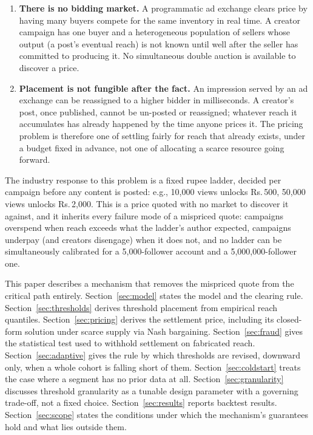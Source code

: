 \documentclass[11pt]{article}
\begin{document}
\begin{enumerate}[leftmargin=1.6em]
\item \textbf{There is no bidding market.} A programmatic ad exchange clears price by having many
buyers compete for the same inventory in real time. A creator campaign has one buyer and a
heterogeneous population of sellers whose output (a post's eventual reach) is not known until well
after the seller has committed to producing it. No simultaneous double auction is available to
discover a price.
\item \textbf{Placement is not fungible after the fact.} An impression served by an ad exchange can
be reassigned to a higher bidder in milliseconds. A creator's post, once published, cannot be
un-posted or reassigned; whatever reach it accumulates has already happened by the time anyone
prices it. The pricing problem is therefore one of settling fairly for reach that already exists,
under a budget fixed in advance, not one of allocating a scarce resource going forward.
\end{enumerate}

The industry response to this problem is a fixed rupee ladder, decided per campaign before any
content is posted: e.g., 10,000 views unlocks Rs.\,500, 50{,}000 views
unlocks Rs.\,2{,}000. This is a price quoted with no market to discover it against, and it inherits
every failure mode of a mispriced quote: campaigns overspend when reach exceeds what the ladder's
author expected, campaigns underpay (and creators disengage) when it does not, and no ladder can be
simultaneously calibrated for a 5,000-follower account and a 5,000,000-follower one.

This paper describes a mechanism that removes the mispriced quote from the critical path entirely.
Section~\ref{sec:model} states the model and the clearing rule. Section~\ref{sec:thresholds}
derives threshold placement from empirical reach quantiles. Section~\ref{sec:pricing} derives the
settlement price, including its closed-form solution under scarce supply via Nash bargaining.
Section~\ref{sec:fraud} gives the statistical test used to withhold settlement on fabricated reach.
Section~\ref{sec:adaptive} gives the rule by which thresholds are revised, downward only, when a
whole cohort is falling short of them. Section~\ref{sec:coldstart} treats the case where a segment
has no prior data at all. Section~\ref{sec:granularity} discusses threshold granularity as a
tunable design parameter with a governing trade-off, not a fixed choice. Section~\ref{sec:results}
reports backtest results. Section~\ref{sec:scope} states the conditions under which the mechanism's
guarantees hold and what lies outside them.
\end{document}
